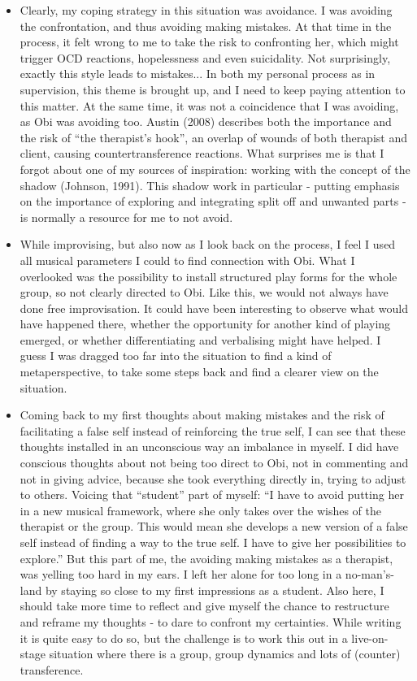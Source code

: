 \documentclass[authordate, empirical, issue]{jote-new-article}
\begin{document}
\begin{itemize}
  \item Clearly, my coping strategy in this situation was avoidance. I was avoiding the confrontation, and thus avoiding making mistakes. At that time in the process, it felt wrong to me to take the risk to confronting her, which might trigger OCD reactions, hopelessness and even suicidality. Not surprisingly, exactly this style leads to mistakes... In both my personal process as in supervision, this theme is brought up, and I need to keep paying attention to this matter. At the same time, it was not a coincidence that I was avoiding, as Obi was avoiding too. Austin (2008) describes both the importance and the risk of “the therapist's hook”, an overlap of wounds of both therapist and client, causing countertransference reactions. What surprises me is that I forgot about one of my sources of inspiration: working with the concept of the shadow (Johnson, 1991). This shadow work in particular - putting emphasis on the importance of exploring and integrating split off and unwanted parts - is normally a resource for me to not avoid.



  \item
        While improvising, but also now as I look back on the process, I feel I used all musical parameters I could to find connection with Obi. What I overlooked was the possibility to install structured play forms for the whole group, so not clearly directed to Obi. Like this, we would not always have done free improvisation. It could have been interesting to observe what would have happened there, whether the opportunity for another kind of playing emerged, or whether differentiating and verbalising might have helped. I guess I was dragged too far into the situation to find a kind of metaperspective, to take some steps back and find a clearer view on the situation.



  \item Coming back to my first thoughts about making mistakes and the risk of facilitating a false self instead of reinforcing the true self, I can see that these thoughts installed in an unconscious way an imbalance in myself. I did have conscious thoughts about not being too direct to Obi, not in commenting and not in giving advice, because she took everything directly in, trying to adjust to others. Voicing that “student” part of myself: “I have to avoid putting her in a new musical framework, where she only takes over the wishes of the therapist or the group. This would mean she develops a new version of a false self instead of finding a way to the true self. I have to give her possibilities to explore.” But this part of me, the avoiding making mistakes as a therapist, was yelling too hard in my ears. I left her alone for too long in a no-man's-land by staying so close to my first impressions as a student. Also here, I should take more time to reflect and give myself the chance to restructure and reframe my thoughts - to dare to confront my certainties. While writing it is quite easy to do so, but the challenge is to work this out in a live-on-stage situation where there is a group, group dynamics and lots of (counter) transference.



\end{itemize}
\end{document}
